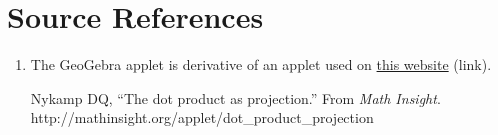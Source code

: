 \documentclass{ximera}
\begin{document}
\section*{Source References}

\begin{enumerate}
   \item The GeoGebra applet is derivative of an applet used on \href{http://mathinsight.org/applet/dot_product_projection}{this website} (link). 
   
   Nykamp DQ, “The dot product as projection.” From \emph{Math Insight}. http://mathinsight.org/applet/dot\_product\_projection
\end{enumerate}
\end{document}
